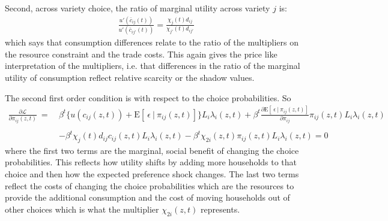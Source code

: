 \documentclass[12pt,pdftex]{article}
\begin{document}
\begin{onehalfspacing}
Second, across variety choice, the ratio of marginal utility across variety $j$ is:
\begin{align}
\frac{u'(\bar c_{ij}(t))}{u'(\bar c_{ij'}(t))} = \frac{\chi_{j}(t) d_{ij}}{\chi_{j'}(t) d_{ij'}}
\end{align}
which says that consumption differences relate to the ratio of the multipliers on the resource constraint and the trade costs. This again gives the price like interpretation of the multipliers, i.e. that differences in the ratio of the marginal utility of consumption reflect relative scarcity or the shadow values. 

The second first order condition is with respect to the choice probabilities. So
\begin{align}
\frac{\partial \mathcal{L} }{\partial \pi_{ij}(z, t)} \ = \ & \beta^{t}\bigg \{  u(c_{ij}(z, t) ) + \mathrm{E}[ \ \epsilon \ | \ \pi_{ij}(z,t) ] \bigg \}L_{i} \lambda_{i}(z, t) + \beta^{t}\frac{\partial \mathrm{E}[ \ \epsilon \ | \ \pi_{ij}(z,t) ]}{\partial \pi_{ij}}\pi_{ij}(z,t) L_{i} \lambda_{i}(z, t) \nonumber \\
\nonumber \\
& - \beta^{t} \chi_{j}(t) d_{ij} c_{ij}(z, t) L_{i}\lambda_{i}(z, t) - \beta^{t} \chi_{2i}(z,t)\pi_{ij}(z,t)L_{i} \lambda_{i}(z, t)  = 0
\end{align}
where the first two terms are the marginal, social benefit of changing the choice probabilities. This reflects how utility shifts by adding more households to that choice and then how the expected preference shock changes. The last two terms reflect the costs of changing the choice probabilities which are the resources to provide the additional consumption and the cost of moving households out of other choices which is what the multiplier $\chi_{2i}(z,t)$ represents.


\end{onehalfspacing}
\end{document}

